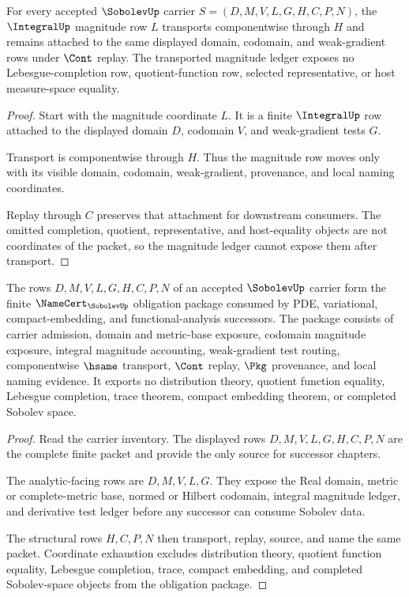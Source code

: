 \begin{theorem}
\label{thm:sobolev-integral-magnitude-ledger-stability}
For every accepted $\SobolevUp$ carrier $S=(D,M,V,L,G,H,C,P,N)$, the $\IntegralUp$ magnitude row $L$ transports componentwise through $H$ and remains attached to the same displayed domain, codomain, and weak-gradient rows under $\Cont$ replay. The transported magnitude ledger exposes no Lebesgue-completion row, quotient-function row, selected representative, or host measure-space equality.
\end{theorem}
\begin{proof}
Start with the magnitude coordinate $L$. It is a finite $\IntegralUp$ row attached to the displayed domain $D$, codomain $V$, and weak-gradient tests $G$.

Transport is componentwise through $H$. Thus the magnitude row moves only with its visible domain, codomain, weak-gradient, provenance, and local naming coordinates.

Replay through $C$ preserves that attachment for downstream consumers. The omitted completion, quotient, representative, and host-equality objects are not coordinates of the packet, so the magnitude ledger cannot expose them after transport.
\end{proof}

\begin{theorem}
\label{thm:sobolev-obligation-package}
The rows $D,M,V,L,G,H,C,P,N$ of an accepted $\SobolevUp$ carrier form the finite $\NameCert_{\SobolevUp}$ obligation package consumed by PDE, variational, compact-embedding, and functional-analysis successors. The package consists of carrier admission, domain and metric-base exposure, codomain magnitude exposure, integral magnitude accounting, weak-gradient test routing, componentwise $\hsame$ transport, $\Cont$ replay, $\Pkg$ provenance, and local naming evidence. It exports no distribution theory, quotient function equality, Lebesgue completion, trace theorem, compact embedding theorem, or completed Sobolev space.
\end{theorem}
\begin{proof}
Read the carrier inventory. The displayed rows $D,M,V,L,G,H,C,P,N$ are the complete finite packet and provide the only source for successor chapters.

The analytic-facing rows are $D,M,V,L,G$. They expose the Real domain, metric or complete-metric base, normed or Hilbert codomain, integral magnitude ledger, and derivative test ledger before any successor can consume Sobolev data.

The structural rows $H,C,P,N$ then transport, replay, source, and name the same packet. Coordinate exhaustion excludes distribution theory, quotient function equality, Lebesgue completion, trace, compact embedding, and completed Sobolev-space objects from the obligation package.
\end{proof}

